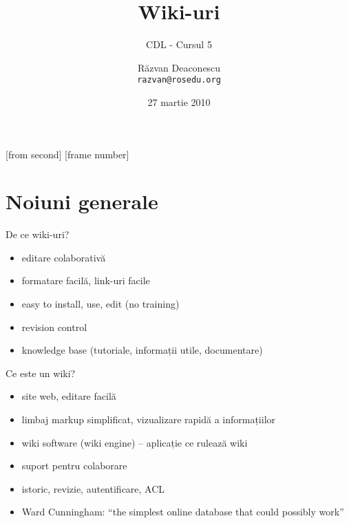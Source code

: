 \documentclass{beamer}
\title[Wiki-uri]{Wiki-uri}
\subtitle{CDL - Cursul 5}
\institute[ROSEdu]{ROSEdu}
\date{27 martie 2010}
\author{Răzvan Deaconescu \\ \texttt{razvan@rosedu.org}}
\begin{document}
[from second]
[frame number]

\frame{\titlepage}

\frame{\tableofcontents}


\section{Noiuni generale}

\frame{\tableofcontents[currentsection]}


\begin{frame}{De ce wiki-uri?}
  \begin{itemize}
    \pause \item editare colaborativă
    \pause \item formatare facilă, link-uri facile
    \pause \item easy to install, use, edit (no training)
    \pause \item revision control
    \pause \item knowledge base (tutoriale, informații utile, documentare)
  \end{itemize}
\end{frame}

\begin{frame}{Ce este un wiki?}
  \begin{itemize}
    \pause \item site web, editare facilă
    \pause \item limbaj markup simplificat, vizualizare rapidă a informațiilor
    \pause \item wiki software (wiki engine) -- aplicație ce rulează wiki
    \pause \item suport pentru colaborare
    \pause \item istoric, revizie, autentificare, ACL
    \pause \item Ward Cunningham: ``the simplest online database that could possibly
work''
  \end{itemize}
\end{frame}
\end{document}
